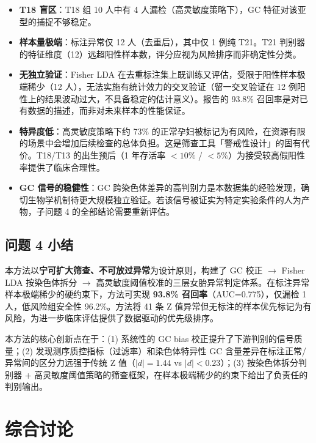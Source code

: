 \documentclass{mcm-paper}
\begin{document}
\begin{itemize}
    \item \textbf{T18 盲区}：T18 组 10 人中有 4 人漏检（高灵敏度策略下），GC 特征对该亚型的捕捉不够稳定。
    \item \textbf{样本量极端}：标注异常仅 12 人（去重后），其中仅 1 例纯 T21。T21 判别器的特征维度（12）远超阳性样本数，评分应视为风险排序而非确定性分类。
    \item \textbf{无独立验证}：Fisher LDA 在去重标注集上既训练又评估，受限于阳性样本极端稀少（12 人），无法实施有统计效力的交叉验证（留一交叉验证在 12 例阳性上的结果波动过大，不具备稳定的估计意义）。报告的 93.8\% 召回率是对已有数据的描述，而非对未来样本的性能保证。
    \item \textbf{特异度低}：高灵敏度策略下约 73\% 的正常孕妇被标记为有风险，在资源有限的场景中会增加后续检查的总体负担。这是筛查工具「警戒性设计」的固有代价。T18/T13 的出生预后（1 年存活率 $<10\%$ / $<5\%$）为接受较高假阳性率提供了临床合理性。
    \item \textbf{GC 信号的稳健性}：GC 跨染色体差异的高判别力是本数据集的经验发现，确切生物学机制待更大规模独立验证。若该信号被证实为特定实验条件的人为产物，子问题 4 的全部结论需要重新评估。
\end{itemize}

\subsection{问题 4 小结}

本方法以\textbf{宁可扩大筛查、不可放过异常}为设计原则，构建了 GC 校正 $\to$ Fisher LDA 按染色体拆分 $\to$ 高灵敏度阈值校准的三层女胎异常判定体系。在标注异常样本极端稀少的硬约束下，方法可实现 \textbf{93.8\% 召回率}（AUC=0.775），仅漏检 1 人，低风险组安全性 96.2\%。方法将 41 条 Z 值异常但无标注的样本优先标记为有风险，为进一步临床评估提供了数据驱动的优先级排序。

本方法的核心创新点在于：(1) 系统性的 GC bias 校正提升了下游判别的信号质量；(2) 发现测序质控指标（过滤率）和染色体特异性 GC 含量差异在标注正常/异常间的区分力远强于传统 Z 值（$|d|=1.44$ vs $|d|<0.23$）；(3) 按染色体拆分判别器 + 高灵敏度阈值策略的筛查框架，在样本极端稀少的约束下给出了负责任的判别输出。

\newpage

\section{综合讨论}
\end{document}
